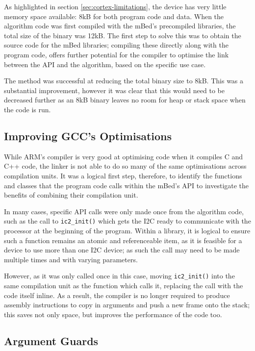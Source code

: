 
As highlighted in section \ref{sec:cortex-limitations}, the device has very little memory space available: 8kB for both program code and data. When the algorithm code was first compiled with the mBed's precompiled libraries, the total size of the binary was 12kB. The first step to solve this was to obtain the source code for the mBed libraries; compiling these directly along with the program code, offers further potential for the compiler to optimise the link between the API and the algorithm, based on the specific use case.

The method was successful at reducing the total binary size to 8kB. This was a substantial improvement, however it was clear that this would need to be decreased further as an 8kB binary leaves no room for heap or stack space when the code is run.

\subsection{Improving GCC's Optimisations}

While ARM's compiler is very good at optimising code when it compiles C and C++ code, the linker is not able to do so many of the same optimisations across compilation units. It was a logical first step, therefore, to identify the functions and classes that the program code calls within the mBed's API to investigate the benefits of combining their compilation unit.

In many cases, specific API calls were only made once from the algorithm code, such as the call to \verb|ic2_init()| which gets the I2C ready to communicate with the processor at the beginning of the program. Within a library, it is logical to ensure such a function remains an atomic and referenceable item, as it is feasible for a device to use more than one I2C device; as such the call may need to be made multiple times and with varying parameters.

However, as it was only called once in this case, moving \verb|ic2_init()| into the same compilation unit as the function which calls it, replacing the call with the code itself inline. As a result, the compiler is no longer required to produce assembly instructions to copy in arguments and push a new frame onto the stack; this saves not only space, but improves the performance of the code too.

\subsection{Argument Guards}

